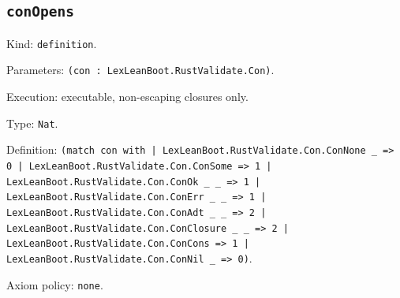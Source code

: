 \documentclass[11pt]{article}
\begin{document}
\subsection*{\texttt{conOpens}}
\noindent Kind: \texttt{definition}.\par
\noindent Parameters: \texttt{(con : LexLeanBoot.RustValidate.Con)}.\par
\noindent Execution: executable, non-escaping closures only.\par
\noindent Type: \texttt{Nat}.\par
\noindent Definition: \texttt{(match con with | LexLeanBoot.RustValidate.Con.ConNone \_ => 0 | LexLeanBoot.RustValidate.Con.ConSome => 1 | LexLeanBoot.RustValidate.Con.ConOk \_ \_ => 1 | LexLeanBoot.RustValidate.Con.ConErr \_ \_ => 1 | LexLeanBoot.RustValidate.Con.ConAdt \_ \_ => 2 | LexLeanBoot.RustValidate.Con.ConClosure \_ \_ => 2 | LexLeanBoot.RustValidate.Con.ConCons => 1 | LexLeanBoot.RustValidate.Con.ConNil \_ => 0)}.\par
\noindent Axiom policy: \texttt{none}.\par
\end{document}
